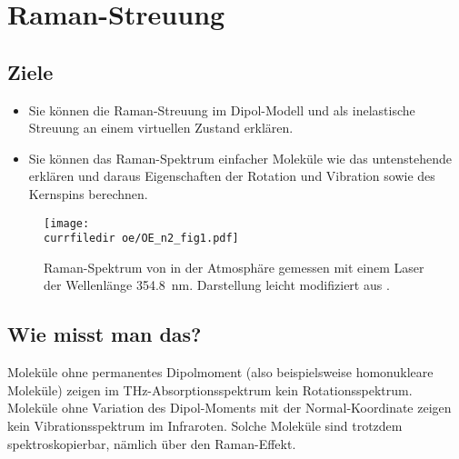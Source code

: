 
\chapter{Raman-Streuung}



% 


\section{Ziele}

\begin{itemize}
\item Sie können die Raman-Streuung im Dipol-Modell und als inelastische Streuung an einem virtuellen Zustand erklären.

\item Sie können das Raman-Spektrum einfacher Moleküle wie das untenstehende erklären und daraus Eigenschaften der Rotation und Vibration sowie des Kernspins berechnen.

\end{itemize}

\begin{figure}
\texttt{[image: \\currfiledir oe/OE\_n2\_fig1.pdf]}
\caption{Raman-Spektrum von  in der Atmosphäre gemessen mit einem Laser der Wellenlänge 354.8~nm. Darstellung leicht modifiziert aus \cite{Liu14_OE_N2}. }
\end{figure}


\section{Wie misst man das?}

Moleküle ohne permanentes Dipolmoment (also beispielsweise homonukleare Moleküle) zeigen im THz-Absorptionsspektrum kein Rotationsspektrum. Moleküle ohne  Variation des Dipol-Moments mit der Normal-Koordinate zeigen kein Vibrationsspektrum im Infraroten. Solche
Moleküle sind trotzdem spektroskopierbar, nämlich über den Raman-Effekt.

